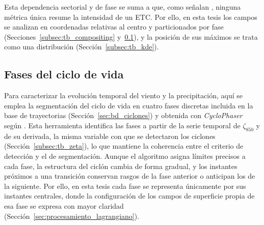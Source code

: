 Esta dependencia sectorial y de fase se suma a que, como señalan \citet{corner2025classification}, ninguna métrica única resume la intensidad de un ETC.
Por ello, en esta tesis los campos se analizan en coordenadas relativas al centro y particionados por fase (Secciones~\ref{subsec:tb_compositing} y~\ref{subsec:tb_fases}), y la posición de sus máximos se trata como una distribución (Sección~\ref{subsec:tb_kde}).

\subsection{Fases del ciclo de vida}\label{subsec:tb_fases}
Para caracterizar la evolución temporal del viento y la precipitación, aquí se emplea la segmentación del ciclo de vida en cuatro fases discretas incluida en la base de trayectorias (Sección~\ref{sec:bd_ciclones}) y obtenida con \textit{CycloPhaser} \citep{deSouza2025CycloPhaser} según \citet{coutodesouza2024new}. 
Esta herramienta identifica las fases a partir de la serie temporal de $\zeta_{850}$ y de su derivada, la misma variable con que se detectaron los ciclones (Sección~\ref{subsec:tb_zeta}), lo que mantiene la coherencia entre el criterio de detección y el de segmentación.
Aunque el algoritmo asigna límites precisos a cada fase, la estructura del ciclón cambia de forma gradual, y los instantes próximos a una transición conservan rasgos de la fase anterior o anticipan los de la siguiente.
Por ello, en esta tesis cada fase se representa únicamente por sus instantes centrales, donde la configuración de los campos de superficie propia de esa fase se expresa con mayor claridad (Sección~\ref{sec:procesamiento_lagrangiano}).

